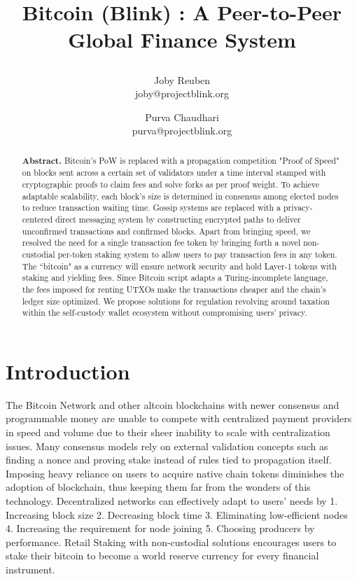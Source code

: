 \documentclass[a4paper,10pt]{article}
\title{
 \large \textbf{Bitcoin (Blink) : A Peer-to-Peer Global Finance System}
\author{ \myfontt Joby Reuben \\ \myfontt joby@projectblink.org \and  \myfontt Purva Chaudhari \\ \myfontt purva@projectblink.org}}
\date{}
\begin{document}
\maketitle
\begin{abstract}
\noindent \textbf{Abstract.} Bitcoin's PoW is replaced with a propagation competition "Proof of Speed" on blocks sent across a certain set of validators under a time interval stamped with cryptographic proofs to claim fees and solve forks as per proof weight. To achieve adaptable scalability, each block's size is determined in consensus among elected nodes to reduce transaction waiting time. Gossip systems are replaced with a privacy-centered direct messaging system by constructing encrypted paths to deliver unconfirmed transactions and confirmed blocks. Apart from bringing speed, we resolved the need for a single transaction fee token by bringing forth a novel non-custodial per-token staking system to allow users to pay transaction fees in any token. The ``bitcoin" as a currency will ensure network security and hold Layer-1 tokens with staking and yielding fees. Since Bitcoin script adapts a Turing-incomplete language, the fees imposed for renting UTXOs make the transactions cheaper and the chain's ledger size optimized. We propose solutions for regulation revolving around taxation within the self-custody wallet ecosystem without compromising users' privacy. 
\end{abstract}
\section{Introduction}
The Bitcoin Network \cite{nakamoto2008bitcoin} and other altcoin blockchains with newer consensus and programmable money are unable to compete with centralized payment providers in speed and volume due to their sheer inability to scale with centralization issues. Many consensus models rely on external validation concepts such as finding a nonce and proving stake instead of rules tied to propagation itself. Imposing heavy reliance on users to acquire native chain tokens diminishes the adoption of blockchain, thus keeping them far from the wonders of this technology. Decentralized networks can effectively adapt to users’ needs by 1. Increasing block size 2. Decreasing block time 3. Eliminating low-efficient nodes 4. Increasing the requirement for node joining 5. Choosing producers by performance. Retail Staking with non-custodial solutions encourages users to stake their bitcoin to become a world reserve currency for every financial instrument.
\end{document}
